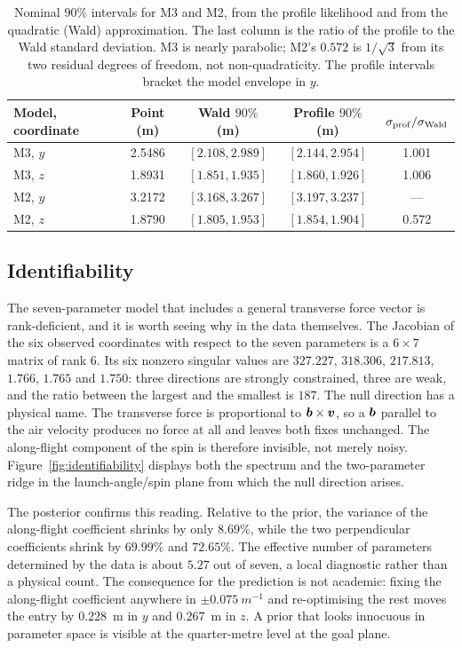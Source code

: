 \begin{table}[t]
  \centering
  \caption{Nominal $90\%$ intervals for M3 and M2, from the profile likelihood and
  from the quadratic (Wald) approximation. The last column is the ratio of the
  profile to the Wald standard deviation. M3 is nearly parabolic; M2's $0.572$ is
  $1/\sqrt{3}$ from its two residual degrees of freedom, not non-quadraticity.
  The profile intervals bracket the model envelope in $y$.}
  \label{tab:intervals}
  \small
  \begin{tabular}{@{}lcccc@{}}
    \toprule
    Model, coordinate & Point (m) & Wald $90\%$ (m) & Profile $90\%$ (m) & $\sigma_{\rm prof}/\sigma_{\rm Wald}$ \\
    \midrule
    M3, $y$ & 2.5486 & $[2.108,2.989]$ & $[2.144,2.954]$ & 1.001 \\
    M3, $z$ & 1.8931 & $[1.851,1.935]$ & $[1.860,1.926]$ & 1.006 \\
    M2, $y$ & 3.2172 & $[3.168,3.267]$ & $[3.197,3.237]$ & --- \\
    M2, $z$ & 1.8790 & $[1.805,1.953]$ & $[1.854,1.904]$ & 0.572 \\
    \bottomrule
  \end{tabular}
\end{table}

\subsection{Identifiability}
\label{sec:identifiability}

The seven-parameter model that includes a general transverse force vector is
rank-deficient, and it is worth seeing why in the data themselves. The Jacobian of
the six observed coordinates with respect to the seven parameters is a $6\times7$
matrix of rank $6$. Its six nonzero singular values are $327.227$, $318.306$,
$217.813$, $1.766$, $1.765$ and $1.750$: three directions are strongly
constrained, three are weak, and the ratio between the largest and the smallest is
$187$. The null direction has a physical name. The transverse force is
proportional to $\bm{b}\times\bm{v}$, so a $\bm{b}$ parallel to the air
velocity produces no force at all and leaves both fixes unchanged. The
along-flight component of the spin is therefore invisible, not merely noisy.
Figure~\ref{fig:identifiability} displays both the spectrum and the
two-parameter ridge in the launch-angle/spin plane from which the null direction
arises.

The posterior confirms this reading. Relative to the prior, the variance of the
along-flight coefficient shrinks by only $8.69\%$, while the two perpendicular
coefficients shrink by $69.99\%$ and $72.65\%$. The effective number of parameters
determined by the data is about $5.27$ out of seven, a local diagnostic rather
than a physical count. The consequence for the prediction is not academic:
fixing the along-flight coefficient anywhere in $\pm0.075~\si{m^{-1}}$ and
re-optimising the rest moves the entry by $0.228$~m in $y$ and $0.267$~m in $z$.
A prior that looks innocuous in parameter space is visible at the quarter-metre
level at the goal plane.


